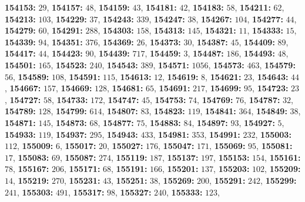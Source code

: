 \textsf{\bfseries 154153:} $29$, \textsf{\bfseries 154157:} $48$, \textsf{\bfseries 154159:} $43$, \textsf{\bfseries 154181:} $42$, \textsf{\bfseries 154183:} $58$, \textsf{\bfseries 154211:} $62$, \textsf{\bfseries 154213:} $103$, \textsf{\bfseries 154229:} $37$, \textsf{\bfseries 154243:} $339$, \textsf{\bfseries 154247:} $38$, \textsf{\bfseries 154267:} $104$, \textsf{\bfseries 154277:} $44$, \textsf{\bfseries 154279:} $60$, \textsf{\bfseries 154291:} $288$, \textsf{\bfseries 154303:} $158$, \textsf{\bfseries 154313:} $145$, \textsf{\bfseries 154321:} $11$, \textsf{\bfseries 154333:} $15$, \textsf{\bfseries 154339:} $94$, \textsf{\bfseries 154351:} $376$, \textsf{\bfseries 154369:} $26$, \textsf{\bfseries 154373:} $30$, \textsf{\bfseries 154387:} $45$, \textsf{\bfseries 154409:} $89$, \textsf{\bfseries 154417:} $44$, \textsf{\bfseries 154423:} $90$, \textsf{\bfseries 154439:} $717$, \textsf{\bfseries 154459:} $3$, \textsf{\bfseries 154487:} $186$, \textsf{\bfseries 154493:} $48$, \textsf{\bfseries 154501:} $165$, \textsf{\bfseries 154523:} $240$, \textsf{\bfseries 154543:} $389$, \textsf{\bfseries 154571:} $1056$, \textsf{\bfseries 154573:} $463$, \textsf{\bfseries 154579:} $56$, \textsf{\bfseries 154589:} $108$, \textsf{\bfseries 154591:} $115$, \textsf{\bfseries 154613:} $12$, \textsf{\bfseries 154619:} $8$, \textsf{\bfseries 154621:} $23$, \textsf{\bfseries 154643:} $44$, \textsf{\bfseries 154667:} $157$, \textsf{\bfseries 154669:} $128$, \textsf{\bfseries 154681:} $65$, \textsf{\bfseries 154691:} $217$, \textsf{\bfseries 154699:} $95$, \textsf{\bfseries 154723:} $23$, \textsf{\bfseries 154727:} $58$, \textsf{\bfseries 154733:} $172$, \textsf{\bfseries 154747:} $45$, \textsf{\bfseries 154753:} $74$, \textsf{\bfseries 154769:} $76$, \textsf{\bfseries 154787:} $32$, \textsf{\bfseries 154789:} $128$, \textsf{\bfseries 154799:} $614$, \textsf{\bfseries 154807:} $83$, \textsf{\bfseries 154823:} $119$, \textsf{\bfseries 154841:} $364$, \textsf{\bfseries 154849:} $38$, \textsf{\bfseries 154871:} $145$, \textsf{\bfseries 154873:} $68$, \textsf{\bfseries 154877:} $75$, \textsf{\bfseries 154883:} $84$, \textsf{\bfseries 154897:} $93$, \textsf{\bfseries 154927:} $5$, \textsf{\bfseries 154933:} $119$, \textsf{\bfseries 154937:} $295$, \textsf{\bfseries 154943:} $433$, \textsf{\bfseries 154981:} $353$, \textsf{\bfseries 154991:} $232$, \textsf{\bfseries 155003:} $112$, \textsf{\bfseries 155009:} $6$, \textsf{\bfseries 155017:} $20$, \textsf{\bfseries 155027:} $176$, \textsf{\bfseries 155047:} $171$, \textsf{\bfseries 155069:} $95$, \textsf{\bfseries 155081:} $17$, \textsf{\bfseries 155083:} $69$, \textsf{\bfseries 155087:} $274$, \textsf{\bfseries 155119:} $187$, \textsf{\bfseries 155137:} $197$, \textsf{\bfseries 155153:} $154$, \textsf{\bfseries 155161:} $78$, \textsf{\bfseries 155167:} $206$, \textsf{\bfseries 155171:} $68$, \textsf{\bfseries 155191:} $166$, \textsf{\bfseries 155201:} $137$, \textsf{\bfseries 155203:} $102$, \textsf{\bfseries 155209:} $14$, \textsf{\bfseries 155219:} $270$, \textsf{\bfseries 155231:} $43$, \textsf{\bfseries 155251:} $38$, \textsf{\bfseries 155269:} $200$, \textsf{\bfseries 155291:} $242$, \textsf{\bfseries 155299:} $241$, \textsf{\bfseries 155303:} $491$, \textsf{\bfseries 155317:} $98$, \textsf{\bfseries 155327:} $240$, \textsf{\bfseries 155333:} $123$, 
